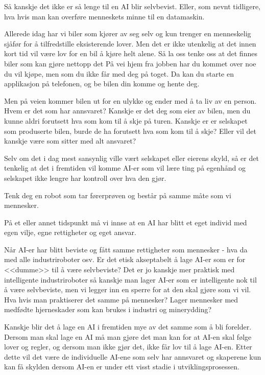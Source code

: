 Så kanskje det ikke er så lenge til en AI blir selvbevist. Eller, som nevnt tidligere, hva hvis man kan overføre menneskets minne til en datamaskin.

Allerede idag har vi biler som kjører av seg selv og kun trenger en
menneskelig sjåfør for å tilfredstille eksisterende lover. Men det er ikke
utenkelig at det innen kort tid vil være lov for en bil å kjøre helt alene. Så la oss tenke oss at det finnes biler som kan gjøre nettopp det På vei hjem fra
jobben har du kommet over noe du vil kjøpe, men som du ikke får med deg på
toget. Da kan du starte en applikasjon på telefonen, og be bilen din komme og hente deg.

Men på veien kommer bilen ut for en ulykke og ender med å ta liv av en person.
Hvem er det som har annsvaret? Kanskje er det deg som eier av bilen, men du
kunne aldri forutsett hva som kom til å skje på turen. Kanskje er er
selskapet som produserte bilen, burde de ha forutsett hva som kom til å skje? Eller vil det kanskje være som sitter med alt ansvaret?

Selv om det i dag mest sansynlig ville vært selskapet eller eierens skyld, så er det tenkelig at det i fremtiden vil komme AI-er som vil lære ting på egenhånd
og selskapet ikke lengre har kontroll over hva den gjør.

Tenk deg en robot som tar førerprøven og består på samme måte som vi mennesker.

På et eller annet tidspunkt må vi innse at en AI har blitt et eget individ med
egen vilje, egne rettigheter og eget ansvar. 


Når AI-er har blitt beviste og fått samme rettigheter som mennesker - hva da
med alle industriroboter osv. Er det etisk akseptabelt å lage AI-er som er for
<<dumme>> til å være selvbeviste?
Det er jo kanskje mer praktisk med intelligente industriroboter så kanskje man
lager AI-er som er intelligente nok til å være selvbeviste, men vi legger inn en
sperre for at den skal gjøre som vi vil. Hva hvis man praktiserer det samme på
mennesker? Lager mennesker med medfødte hjerneskader som kan brukes i industri
og minerydding?


Kanskje blir det å lage en AI i fremtiden mye av det samme som å bli forelder.
Dersom man skal lage en AI må man gjøre det man kan for at AI-en skal følge
lover og regler, og dersom man ikke gjør det, ikke får lov til å lage AI-en.
Etter dette vil det være de individuelle AI-ene som selv har annsvaret og
skaperene kun kan få skylden dersom AI-en er under ett visst stadie i utviklingsprosessen.
